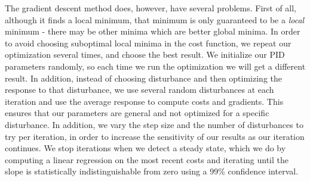\documentclass{article}
\begin{document}
The gradient descent method does, however, have several problems. First of all, although it finds a
local minimum, that minimum is only guaranteed to be a \emph{local} minimum - there may be other
minima which are better global minima. In order to avoid choosing suboptimal local minima in the
cost function, we repeat our optimization several times, and choose the best result. We initialize
our PID parameters randomly, so each time we run the optimization we will get a different result. In
addition, instead of choosing disturbance and then optimizing the response to that disturbance, we
use several random disturbances at each iteration and use the average response to compute costs and
gradients. This ensures that our parameters are general and not optimized for a specific
disturbance. In addition, we vary the step size and the number of disturbances to try per iteration,
in order to increase the sensitivity of our results as our iteration continues. We stop iterations
when we detect a steady state, which we do by computing a linear regression on the most recent costs
and iterating until the slope is statistically indistinguishable from zero using a 99\% confidence
interval.
\end{document}
